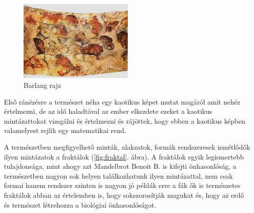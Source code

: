 \begin{figure}[h!]
	\centering
	\includegraphics[width=0.5\textwidth]{img/osi.jpg}
	\caption{Barlang rajz}
	\label{fig:osi}
\end{figure}

Első ránézésre a természet néha egy kaotikus képet mutat magáról amit nehéz értelmezni, de az idő haladtával az ember elkezdete ezeket a kaotikus mintázattokat vizsgálni és értelmezni és rájöttek, hogy ebben a kaotikus képben valamelyest rejlik egy matematikai rend.

A természetben megfigyelhető minták, alakzatok, formák rendszeresek ismétlődők ilyen mintázatok a fraktálok (\ref{fig:fraktal}. ábra). A fraktálok egyik legismertebb tulajdonsága, mint ahogy azt Mandelbrot Benoit B. is kifejti \cite{mandelbrot1982fractal} önhasonlóság, a természetben nagyon sok helyen találkozhatunk ilyen mintázattal, nem csak formai hanem rendszer szinten is nagyon jó példák erre a fák ők is természetes fraktálok abban az értelemben is, hogy sokszorosítják magukat és, hogy az erdő és természet létrehozza a biológiai önhasonlóságot. 

